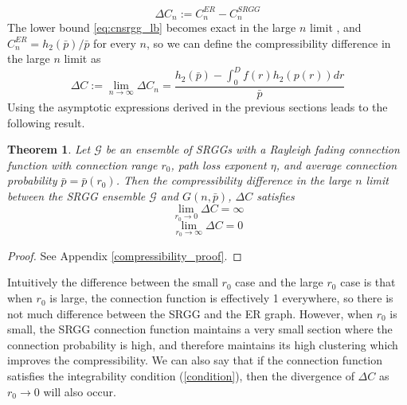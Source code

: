 \documentclass{article}
\newtheorem{theorem}{Theorem}
\newcommand{\tti}{\rightarrow\infty}
\newcommand{\graph}{\mathcal{G}}
\newcommand{\ttz}[0]{\rightarrow 0}
\begin{document}
    \begin{equation}
        \Delta C_n := C_n^{ER} - C_n^{SRGG}
    \end{equation}
    The lower bound \eqref{eq:cnsrgg_lb} becomes exact in the large $n$ limit \cite{janson2010graphons}, and $C_n^{ER} = h_2(\bar{p})/\bar{p}$ for every $n$, so we can define the compressibility difference in the large $n$ limit as
    \begin{equation}
        \Delta C := \lim_{n\tti} \Delta C_n = \frac{h_2(\bar{p}) - \int_0^Df(r)h_2(p(r))dr}{\bar{p}} 
    \end{equation}
    Using the asymptotic expressions derived in the previous sections leads to the following result.
    \begin{theorem}
        \label{compressibility_thm}
        Let $\graph$ be an ensemble of SRGGs with a Rayleigh fading connection function with connection range $r_0$, path loss exponent $\eta$, and average connection probability $\bar{p} = \bar{p}(r_0)$. Then the compressibility difference in the large $n$ limit between the SRGG ensemble $\graph$ and $G(n,\bar{p})$, $\Delta C$ satisfies
        \begin{equation}
            \lim_{r_0 \ttz} \Delta C = \infty
        \end{equation}
        \begin{equation}
            \lim_{r_0\tti} \Delta C = 0 
        \end{equation}
    \end{theorem}
    \begin{proof}
        See Appendix \ref{compressibility_proof}.
    \end{proof}
 Intuitively the difference between the small $r_0$ case and the large $r_0$ case is that when $r_0$ is large, the connection function is effectively 1 everywhere, so there is not much difference between the SRGG and the ER graph. However, when $r_0$ is small, the SRGG connection function maintains a very small section where the connection probability is high, and therefore maintains its high clustering which improves the compressibility. We can also say that if the connection function satisfies the integrability condition (\ref{condition}), then the divergence of $\Delta C$ as $r_0\ttz$ will also occur. 
\end{document}
